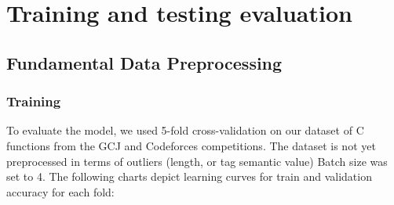 \documentclass[10pt,english,a4paper]{report}
\begin{document}
\chapter{Training and testing evaluation}
\label{item:chapter_testing}

\section{Fundamental Data Preprocessing}

\subsection{Training}

To evaluate the model, we used 5-fold cross-validation on our dataset of 
C functions from the GCJ and Codeforces competitions. The dataset is not yet
preprocessed in terms of outliers (length, or tag semantic value) Batch size was set to 4. 
The following charts depict learning curves for train and validation accuracy for each fold:
\end{document}
